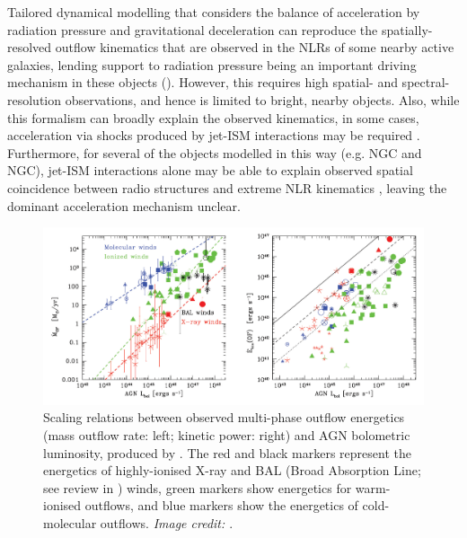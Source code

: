 Tailored dynamical modelling that considers the balance of acceleration by radiation pressure and gravitational deceleration can reproduce the spatially-resolved outflow kinematics that are observed in the NLRs of some nearby active galaxies, lending support to radiation pressure being an important driving mechanism in these objects (\citealt{Crenshaw2000_N1068, Crenshaw2000_N4151, Das2005, Fischer2017, Revalski2018, Meena2021}). However, this requires high spatial- and spectral-resolution observations, and hence is limited to bright, nearby objects. Also, while this formalism can broadly explain the observed kinematics, in some cases, acceleration via shocks produced by jet-ISM interactions may be required \citep{Das2006, Das2007, Meena2023}. Furthermore, for several of the objects modelled in this way (e.g. NGC and NGC), jet-ISM interactions alone may be able to explain observed spatial coincidence between radio structures and extreme NLR kinematics \citep{Capetti1995a, Capetti1995b, Axon1998, Das2006, May2017, May2020}, leaving the dominant acceleration mechanism unclear.

\begin{figure}[!t]
    \centering
    \includegraphics[width=\linewidth]{figures/introduction/fiore2017_mout_ekin_lbol.pdf}
    \caption[Observed multi-phase outflow scaling relations between outflow energetics and host AGN bolometric luminosity, as presented by \citet{Fiore2017}.]{Scaling relations between observed multi-phase outflow energetics (mass outflow rate: left; kinetic power: right) and AGN bolometric luminosity, produced by \citet{Fiore2017}. The red and black markers represent the energetics of highly-ionised X-ray and BAL (Broad Absorption Line; see review in \citealt{Gibson2009}) winds, green markers show energetics for warm-ionised outflows, and blue markers show the energetics of cold-molecular outflows. \textit{Image credit: \citet{Fiore2017}}.}
    \label{fig: introduction: outflows: acceleration_mechanisms: fiore2017_mout_ekin_lbol}
\end{figure}

